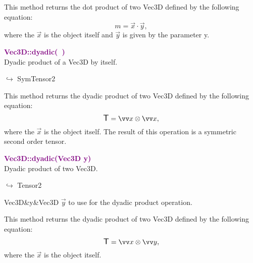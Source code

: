 This method returns the dot product of two Vec3D defined by the following equation:
\begin{equation*}
m = \overrightarrow{x}\cdot\overrightarrow{y},
\end{equation*}
where the $\overrightarrow{x}$ is the object itself and $\overrightarrow{y}$ is given by the parameter y.

\textcolor{purple}{\textbf{Vec3D::dyadic(~)}}\label{Vec3D::dyadic()}\\
Dyadic product of a Vec3D by itself.\vspace*{-0.5em}
\begin{tcolorbox}[grow to left by=-1cm, width=\textwidth-1cm,myArgs,tabularx={l|R}]
$\hookrightarrow$ SymTensor2
\end{tcolorbox}

This method returns the dyadic product of two Vec3D defined by the following equation:
\begin{equation*}
\T = \overrightarrow{x}\otimes\overrightarrow{x},
\end{equation*}
where the $\overrightarrow{x}$ is the object itself. The result of this operation is a symmetric second order tensor.

\textcolor{purple}{\textbf{Vec3D::dyadic(Vec3D y)}}\label{Vec3D::dyadic(Vec3D y)}\\
Dyadic product of two Vec3D.\vspace*{-0.5em}
\begin{tcolorbox}[grow to left by=-1cm, width=\textwidth-1cm,myArgs,tabularx={l|R}]
$\hookrightarrow$ Tensor2
\end{tcolorbox}

\begin{tcolorbox}[width=\textwidth,myArgs,tabularx={ll|R}]
Vec3D&y&Vec3D $\overrightarrow{y}$ to use for the dyadic product operation.
\end{tcolorbox}

This method returns the dyadic product of two Vec3D defined by the following equation:
\begin{equation*}
\T = \overrightarrow{x}\otimes\overrightarrow{y},
\end{equation*}
where the $\overrightarrow{x}$ is the object itself.

